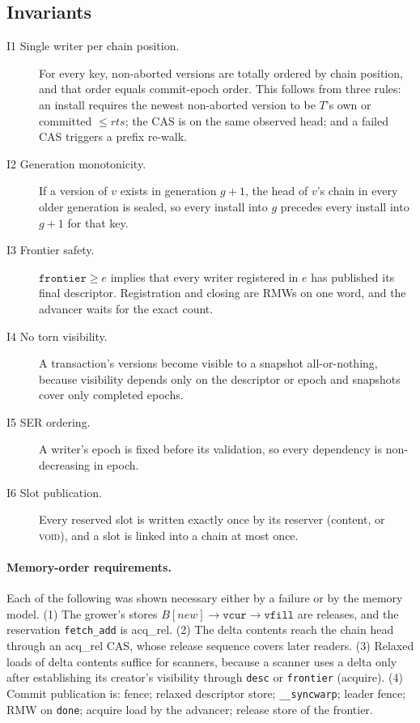 \documentclass[sigconf,nonacm]{acmart}
\newcommand{\code}[1]{\texttt{#1}}
\begin{document}
\subsection{Invariants}
\label{sec:inv}
\begin{description}
\item[I1 Single writer per chain position.] For every key, non-aborted versions are totally ordered by chain
position, and that order equals commit-epoch order. This follows from three rules: an install requires the newest
non-aborted version to be $T$'s own or committed $\le rts$; the CAS is on the same observed head; and a failed CAS
triggers a prefix re-walk.
\item[I2 Generation monotonicity.] If a version of $v$ exists in generation $g{+}1$, the head of $v$'s chain in every
older generation is sealed, so every install into $g$ precedes every install into $g{+}1$ for that key.
\item[I3 Frontier safety.] $\code{frontier} \ge e$ implies that every writer registered in $e$ has published its final
descriptor. Registration and closing are RMWs on one word, and the advancer waits for the exact count.
\item[I4 No torn visibility.] A transaction's versions become visible to a snapshot all-or-nothing, because
visibility depends only on the descriptor or epoch and snapshots cover only completed epochs.
\item[I5 SER ordering.] A writer's epoch is fixed before its validation, so every dependency is non-decreasing in
epoch.
\item[I6 Slot publication.] Every reserved slot is written exactly once by its reserver (content, or \textsc{void}),
and a slot is linked into a chain at most once.
\end{description}

\paragraph{Memory-order requirements.} Each of the following was shown necessary either by a failure or by the
memory model. (1) The grower's stores $B[new] \rightarrow \code{vcur} \rightarrow \code{vfill}$ are releases, and the
reservation \code{fetch\_add} is acq\_rel. (2) The delta contents reach the chain head through an acq\_rel CAS, whose
release sequence covers later readers. (3) Relaxed loads of delta contents suffice for scanners, because a scanner
uses a delta only after establishing its creator's visibility through \code{desc} or \code{frontier} (acquire).
(4) Commit publication is: fence; relaxed descriptor store; \code{\_\_syncwarp}; leader fence; RMW on \code{done};
acquire load by the advancer; release store of the frontier.
\end{document}
